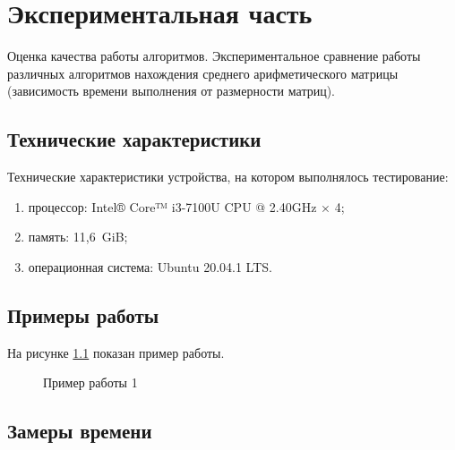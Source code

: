 


\chapter{Экспериментальная часть}\label{exp}

Оценка качества работы алгоритмов. Экспериментальное сравнение работы различных алгоритмов нахождения среднего арифметического матрицы
(зависимость времени выполнения от размерности матриц).

\section{Технические характеристики}\label{texcharacters}

Технические характеристики устройства, на котором выполнялось тестирование:

\begin{enumerate}
    \item процессор: Intel® Core™ i3-7100U CPU @ 2.40GHz × 4; 
    \item память: 11,6 GiB;
    \item операционная система: Ubuntu 20.04.1 LTS.
\end{enumerate}

\section{Примеры работы}\label{examples}

На рисунке \ref{ris:w1} показан пример работы.

\begin{figure}[H]
    \center{\texttt{[image: w1]}}
    \caption{Пример работы 1}
    \label{ris:w1}
\end{figure}
  
  

\newpage

\section{Замеры времени}\label{experimentgraph}

